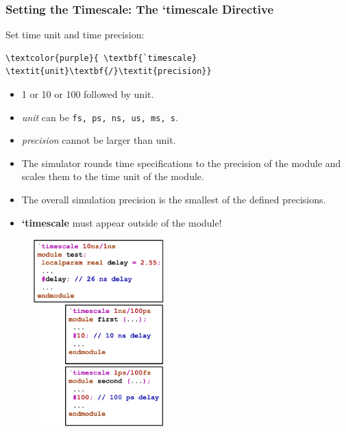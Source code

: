 \documentclass[t, notes, xcolor=table]{beamer}
\begin{document}
\begin{frame}[fragile]
\frametitle{Setting the Timescale: The `timescale Directive}
\scriptsize{
\begin{multicols}{2}
Set time unit and time precision:
\begin{Verbatim}[commandchars=\\\{\}, tabsize=2]
\textcolor{purple}{	\textbf{`timescale} \textit{unit}\textbf{/}\textit{precision}}
\end{Verbatim}
\begin{itemize}
\item 1 or 10 or 100 followed by unit.
\item \textit{unit} can be \verb+fs, ps, ns, us, ms, s+.
\item \textit{precision} cannot be larger than unit.
\item The simulator rounds time specifications to the precision of the module and scales them to the time unit of the module.
\item The overall simulation precision is the smallest of the defined precisions.
\item \textbf{`timescale} must appear outside of the module!
\end{itemize}
\vfill
\columnbreak
\begin{figure}
    \includegraphics[width=0.45\textwidth]{img/11_timescale.png}
\end{figure}
\end{multicols}
}
\end{frame}
\end{document}
